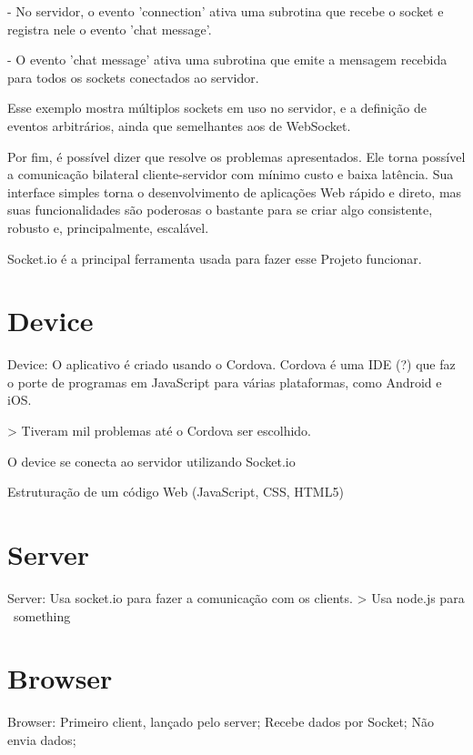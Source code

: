 \documentclass[a4paper,12pt]{article}
\begin{document}
- No servidor, o evento 'connection' ativa uma subrotina que recebe o socket e registra nele o evento 'chat message'.

- O evento 'chat message' ativa uma subrotina que emite a mensagem recebida para todos os sockets conectados ao servidor.

Esse exemplo mostra múltiplos sockets em uso no servidor, e a definição de eventos arbitrários, ainda que semelhantes aos de WebSocket.

Por fim, é possível dizer que resolve os problemas apresentados. Ele torna possível a comunicação bilateral cliente-servidor com mínimo custo e baixa latência. Sua interface simples torna o desenvolvimento de aplicações Web rápido e direto, mas suas funcionalidades são poderosas o bastante para se criar algo consistente, robusto e, principalmente, escalável.

Socket.io é a principal ferramenta usada para fazer esse Projeto funcionar.

\newpage

\section{Device}


Device:
  O aplicativo é criado usando o Cordova.
    Cordova é uma IDE (?) que faz o porte de programas em JavaScript para várias plataformas, como Android e iOS.


    > Tiveram mil problemas até o Cordova ser escolhido.


  O device se conecta ao servidor utilizando Socket.io




Estruturação de um código Web (JavaScript, CSS, HTML5)







\section{Server}

Server:
  Usa socket.io para fazer a comunicação com os clients.
  > Usa node.js para ~something~




\section{Browser}

Browser:
  Primeiro client, lançado pelo server;
  Recebe dados por Socket;
  Não envia dados;
\end{document}
